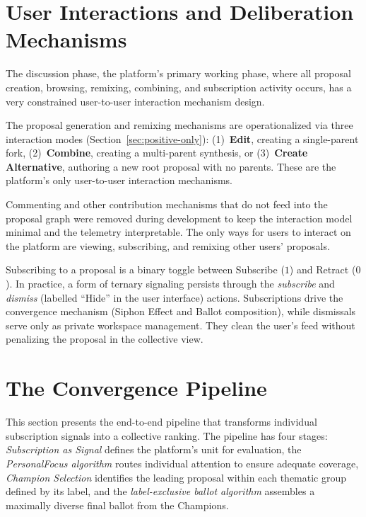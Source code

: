 \documentclass[a4paper, 12pt, twoside]{iviathesis}
\begin{document}

\section{User Interactions and Deliberation Mechanisms}
\label{sec:delib-mechanisms}
The discussion phase, the platform's primary working phase, where all proposal creation, browsing, remixing, combining, and subscription activity occurs, has a very constrained user-to-user interaction mechanism design.

The proposal generation and remixing mechanisms are operationalized via three interaction modes (Section~\ref{sec:positive-only}): (1)~\textbf{Edit}, creating a single-parent fork, (2)~\textbf{Combine}, creating a multi-parent synthesis, or (3)~\textbf{Create Alternative}, authoring a new root proposal with no parents. These are the platform's only user-to-user interaction mechanisms.

Commenting and other contribution mechanisms that do not feed into the proposal graph were removed during development to keep the interaction model minimal and the telemetry interpretable. The only ways for users to interact on the platform are viewing, subscribing, and remixing other users' proposals.

Subscribing to a proposal is a binary toggle between Subscribe ($1$) and Retract ($0$).
In practice, a form of ternary signaling persists through the \textit{subscribe} and \textit{dismiss} (labelled ``Hide'' in the user interface) actions. Subscriptions drive the convergence mechanism (Siphon Effect and Ballot composition), while dismissals serve only as private workspace management. They clean the user's feed without penalizing the proposal in the collective view. 


\section{The Convergence Pipeline}
\label{sec:convergence-pipeline}
This section presents the end-to-end pipeline that transforms individual subscription signals into a collective ranking. The pipeline has four stages: \textit{Subscription as Signal} defines the platform's unit for evaluation, the \textit{PersonalFocus algorithm} routes individual attention to ensure adequate coverage, \textit{Champion Selection} identifies the leading proposal within each thematic group defined by its label, and the \textit{label-exclusive ballot algorithm} assembles a maximally diverse final ballot from the Champions.
\end{document}
